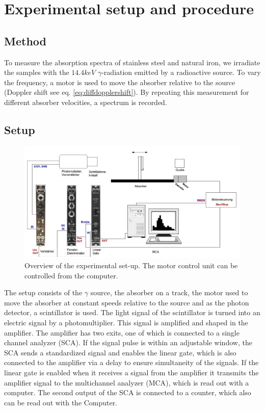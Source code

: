 \section{Experimental setup and procedure}
\subsection{Method}
To measure the absorption spectra of stainless steel and natural iron, we irradiate the samples with the $14.4keV$ $\gamma$-radiation emitted by a radioactive source. To vary the frequency, a motor is used to move the absorber relative to the source (Doppler shift see eq.  \ref{eq:diffdopplershift}). By repeating this measurement for different absorber velocities, a spectrum is recorded.\\
\subsection{Setup}
\begin{figure}[hbt]
\centering
\includegraphics[width=1.0\linewidth]{graphics/Aufbau}
\caption[Overview of the experimental set-up]{Overview of the experimental set-up. The motor control unit can be controlled from the computer. \cite{anleitung}}
\label{fig:Aufbau}
\end{figure}

The setup consists of the $\gamma$ source, the absorber on a track, the motor used to move the absorber at constant speeds relative to the source and as the photon detector, a scintillator is used. The light signal of the scintillator is turned into an electric signal by a photomultiplier. This signal is amplified and shaped in the amplifier. The amplifier has two exits, one of which is connected to a single channel analyzer (SCA). If the signal pulse is within an adjustable window, the SCA sends a standardized signal and enables the linear gate, which is also connected to the amplifier via a delay to ensure simultaneity of the signals. If the linear gate is enabled when it receives a signal from the amplifier it transmits the amplifier signal to the multichannel analyzer (MCA), which is read out with a computer. The second output of the SCA is connected to a counter, which also can be read out with the Computer.

